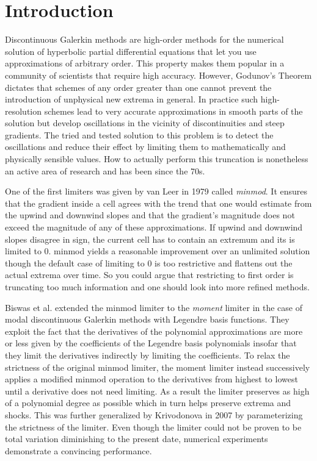 \section{Introduction}

Discontinuous Galerkin methods are high-order methods for the numerical solution of hyperbolic partial differential equations that let you use approximations of arbitrary order.
This property makes them popular in a community of scientists that require high accuracy.
However, Godunov's Theorem dictates that schemes of any order greater than one cannot prevent the introduction of unphysical new extrema in general.
In practice such high-resolution schemes lead to very accurate approximations in smooth parts of the solution but develop oscillations in the vicinity of discontinuities and steep gradients.
The tried and tested solution to this problem is to detect the oscillations and reduce their effect by limiting them to mathematically and physically sensible values.
How to actually perform this truncation is nonetheless an active area of research and has been since the 70s.

One of the first limiters was given by van Leer in 1979 called \emph{minmod}\cite{VanLeer1979}.
It ensures that the gradient inside a cell agrees with the trend that one would estimate from the upwind and downwind slopes and that the gradient's magnitude does not exceed the magnitude of any of these approximations.
If upwind and downwind slopes disagree in sign, the current cell has to contain an extremum and its  is limited to $0$.
minmod yields a reasonable improvement over an unlimited solution though the default case of limiting to $0$ is too restrictive and flattens out the actual extrema over time.
So you could argue that restricting to first order is truncating too much information and one should look into more refined methods.

Biswas et al. extended the minmod limiter to the \emph{moment} limiter\cite{Biswas1994} in the case of modal discontinuous Galerkin methods with Legendre basis functions.
They exploit the fact that the derivatives of the polynomial approximations are more or less given by the coefficients of the Legendre basis polynomials insofar that they limit the derivatives indirectly by limiting the coefficients.
To relax the strictness of the original minmod limiter, the moment limiter instead successively applies a modified minmod operation to the derivatives from highest to lowest until a derivative does not need limiting.
As a result the limiter preserves as high of a polynomial degree as possible which in turn helps preserve extrema and shocks.
This was further generalized by Krivodonova in 2007 by parameterizing the strictness of the limiter\cite{Krivodonova}.
Even though the limiter could not be proven to be total variation diminishing to the present date, numerical experiments demonstrate a convincing performance.

